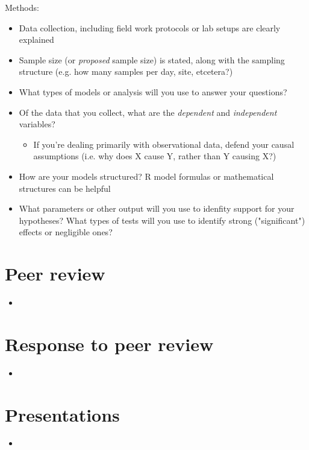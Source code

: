 \documentclass[11pt]{article}
\begin{document}
Methods:
  \begin{itemize}
    \item Data collection, including field work protocols or lab setups are clearly explained
    \item Sample size (or \emph{proposed} sample size) is stated, along with the sampling structure (e.g. how many samples per day, site, etcetera?)
  \item What types of models or analysis will you use to answer your questions?
    \item Of the data that you collect, what are the \emph{dependent} and \emph{independent} variables?
    \begin{itemize} 
      \item If you're dealing primarily with observational data, defend your causal assumptions (i.e. why does X cause Y, rather than Y causing X?)
    \end{itemize}
    \item How are your models structured? R model formulas or mathematical structures can be helpful
    \item What parameters or other output will you use to idenfity support for your hypotheses? What types of tests will you use to identify strong ("significant") effects or negligible ones?
  \end{itemize}

\section*{Peer review}

\begin{itemize}
\item 
\end{itemize}

\section*{Response to peer review}

\begin{itemize}
\item 
\end{itemize}

\section*{Presentations}

\begin{itemize}
\item 
\end{itemize}
\end{document}

